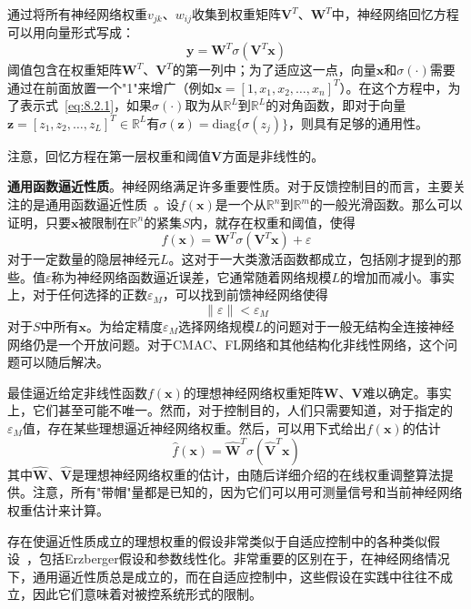 \documentclass[12pt,a4paper]{ctexart}
\begin{document}
通过将所有神经网络权重$v_{jk}$、$w_{ij}$收集到权重矩阵$\bm{V}^T$、$\bm{W}^T$中，神经网络回忆方程可以用向量形式写成：
\begin{equation}\label{eq:8.2.4}
\bm{y} = \bm{W}^T \sigma(\bm{V}^T \bm{x})
\end{equation}
阈值包含在权重矩阵$\bm{W}^T$、$\bm{V}^T$的第一列中；为了适应这一点，向量$\bm{x}$和$\sigma(\cdot)$需要通过在前面放置一个"1"来增广（例如$\bm{x} = [1, x_1, x_2, \ldots, x_n]^T$）。在这个方程中，为了表示式~\eqref{eq:8.2.1}，如果$\sigma(\cdot)$取为从$\mathbb{R}^L$到$\mathbb{R}^L$的对角函数，即对于向量$\bm{z} = [z_1, z_2, \ldots, z_L]^T \in \mathbb{R}^L$有$\sigma(\bm{z}) = \text{diag}\{\sigma(z_j)\}$，则具有足够的通用性。

注意，回忆方程在第一层权重和阈值$\bm{V}$方面是非线性的。

\textbf{通用函数逼近性质}。神经网络满足许多重要性质。对于反馈控制目的而言，主要关注的是通用函数逼近性质~\cite{hornik1989}。设$f(\bm{x})$是一个从$\mathbb{R}^n$到$\mathbb{R}^m$的一般光滑函数。那么可以证明，只要$\bm{x}$被限制在$\mathbb{R}^n$的紧集$S$内，就存在权重和阈值，使得
\begin{equation}\label{eq:8.2.5}
f(\bm{x}) = \bm{W}^T \sigma(\bm{V}^T \bm{x}) + \varepsilon
\end{equation}
对于一定数量的隐层神经元$L$。这对于一大类激活函数都成立，包括刚才提到的那些。值$\varepsilon$称为神经网络函数逼近误差，它通常随着网络规模$L$的增加而减小。事实上，对于任何选择的正数$\varepsilon_M$，可以找到前馈神经网络使得
\begin{equation}\label{eq:8.2.6}
\|\varepsilon\| < \varepsilon_M
\end{equation}
对于$S$中所有$\bm{x}$。为给定精度$\varepsilon_M$选择网络规模$L$的问题对于一般无结构全连接神经网络仍是一个开放问题。对于CMAC、FL网络和其他结构化非线性网络，这个问题可以随后解决。

最佳逼近给定非线性函数$f(\bm{x})$的理想神经网络权重矩阵$\bm{W}$、$\bm{V}$难以确定。事实上，它们甚至可能不唯一。然而，对于控制目的，人们只需要知道，对于指定的$\varepsilon_M$值，存在某些理想逼近神经网络权重。然后，可以用下式给出$f(\bm{x})$的估计
\begin{equation}\label{eq:8.2.7}
\hat{f}(\bm{x}) = \hat{\bm{W}}^T \sigma(\hat{\bm{V}}^T \bm{x})
\end{equation}
其中$\hat{\bm{W}}$、$\hat{\bm{V}}$是理想神经网络权重的估计，由随后详细介绍的在线权重调整算法提供。注意，所有"带帽"量都是已知的，因为它们可以用可测量信号和当前神经网络权重估计来计算。

存在使逼近性质成立的理想权重的假设非常类似于自适应控制中的各种类似假设~\cite{astrom1989,landau1979}，包括Erzberger假设和参数线性化。非常重要的区别在于，在神经网络情况下，通用逼近性质总是成立的，而在自适应控制中，这些假设在实践中往往不成立，因此它们意味着对被控系统形式的限制。
\end{document}
